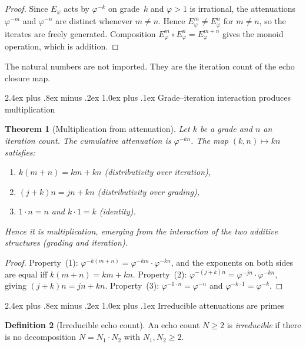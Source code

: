 \documentclass[11pt,a4paper]{article}
\makeatletter
\theoremstyle{plain}
\newtheorem{theorem}{Theorem}[section]
\theoremstyle{definition}
\newtheorem{definition}[theorem]{Definition}
\theoremstyle{remark}
\numberwithin{equation}{section}
\newcommand{\vp}{\varphi}
\renewcommand{\subsection}{%
  \@startsection{subsection}{2}{0pt}%
    {2.4ex plus .8ex minus .2ex}%
    {1.0ex plus .1ex}%
    {\normalfont\Large\bfseries\color{headingAccent}}%
}
\makeatother
\begin{document}
\begin{proof}
Since \(E_\vp\) acts by \(\vp^{-k}\) on grade~\(k\) and \(\vp>1\)
is irrational, the attenuations \(\vp^{-m}\) and \(\vp^{-n}\) are
distinct whenever \(m\ne n\).  Hence \(E_\vp^m\ne E_\vp^n\) for
\(m\ne n\), so the iterates are freely generated.  Composition
\(E_\vp^m\circ E_\vp^n=E_\vp^{m+n}\) gives the monoid operation,
which is addition.
\end{proof}

The natural numbers are not imported.  They are the iteration count
of the echo closure map.

\subsection{Grade--iteration interaction produces multiplication}
\label{subsec:multiplication}

\begin{theorem}[Multiplication from attenuation]
\label{thm:multiplication-attenuation}
Let \(k\) be a grade and \(n\) an iteration count.  The
cumulative attenuation is \(\vp^{-kn}\).  The map
\((k,n)\mapsto kn\) satisfies:
\begin{enumerate}
  \item \(k(m+n)=km+kn\) \quad (distributivity over iteration),
  \item \((j+k)n=jn+kn\) \quad (distributivity over grading),
  \item \(1\cdot n=n\) and \(k\cdot 1=k\) \quad (identity).
\end{enumerate}
Hence it is multiplication, emerging from the interaction of the two
additive structures (grading and iteration).
\end{theorem}

\begin{proof}
Property~(1): \(\vp^{-k(m+n)}=\vp^{-km}\cdot\vp^{-kn}\), and the
exponents on both sides are equal iff \(k(m+n)=km+kn\).
Property~(2): \(\vp^{-(j+k)n}=\vp^{-jn}\cdot\vp^{-kn}\), giving
\((j+k)n=jn+kn\).  Property~(3): \(\vp^{-1\cdot n}=\vp^{-n}\)
and \(\vp^{-k\cdot1}=\vp^{-k}\).
\end{proof}

\subsection{Irreducible attenuations are primes}
\label{subsec:irreducible-primes}

\begin{definition}[Irreducible echo count]
An echo count \(N\ge2\) is \emph{irreducible} if there is no
decomposition \(N=N_1\cdot N_2\) with \(N_1,N_2\ge2\).
\end{definition}
\end{document}
